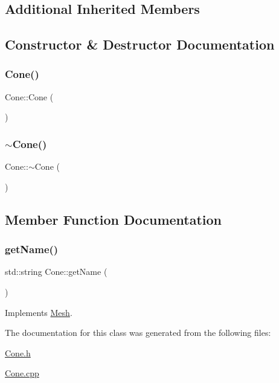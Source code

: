 \subsection*{Additional Inherited Members}


\subsection{Constructor \& Destructor Documentation}
\mbox{\label{class_cone_aec709e915b3271a750d420b14b215bfb}} 
\subsubsection{\texorpdfstring{Cone()}{Cone()}}
{\footnotesize\ttfamily Cone\+::\+Cone (\begin{DoxyParamCaption}{ }\end{DoxyParamCaption})}

\mbox{\label{class_cone_a36a6a946043f7b24a34e42cb88b5a4e8}} 
\subsubsection{\texorpdfstring{$\sim$Cone()}{~Cone()}}
{\footnotesize\ttfamily Cone\+::$\sim$\+Cone (\begin{DoxyParamCaption}{ }\end{DoxyParamCaption})}



\subsection{Member Function Documentation}
\mbox{\label{class_cone_a9581010134e3d1fe079fe5cce1933786}} 
\subsubsection{\texorpdfstring{getName()}{getName()}}
{\footnotesize\ttfamily std\+::string Cone\+::get\+Name (\begin{DoxyParamCaption}{ }\end{DoxyParamCaption})\hspace{0.3cm}{\ttfamily [virtual]}}



Implements \mbox{\hyperlink{class_mesh_aa131fe1c2586fe60988155db77c57272}{Mesh}}.



The documentation for this class was generated from the following files\+:\begin{DoxyCompactItemize}
\item 
\mbox{\hyperlink{_cone_8h}{Cone.\+h}}\item 
\mbox{\hyperlink{_cone_8cpp}{Cone.\+cpp}}\end{DoxyCompactItemize}
